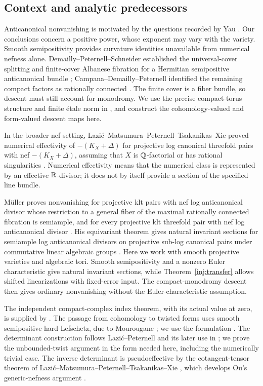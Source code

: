 \subsection{Context and analytic predecessors}
Anticanonical nonvanishing is motivated by the questions recorded by Yau \cite[Problem~75]{Yau1994}. Our conclusions concern a positive power, whose exponent may vary with the variety. Smooth semipositivity provides curvature identities unavailable from numerical nefness alone. Demailly--Peternell--Schneider established the universal-cover splitting and finite-cover Albanese fibration for a Hermitian semipositive anticanonical bundle \cite[Structure Theorem]{DPS1996}; Campana--Demailly--Peternell identified the remaining compact factors as rationally connected \cite[Theorem~1.4]{CDP2015}. The finite cover is a fiber bundle, so descent must still account for monodromy. We use the precise compact-torus structure and finite \'etale norm in \cite{CompanionH}, and construct the cohomology-valued and form-valued descent maps here.

In the broader nef setting, Lazi\'c--Matsumura--Peternell--Tsakanikas--Xie proved numerical effectivity of $-(K_X+\Delta)$ for projective log canonical threefold pairs with nef $-(K_X+\Delta)$, assuming that $X$ is $\mathbb Q$-factorial or has rational singularities \cite[Theorem~A]{LMPTX2023}. Numerical effectivity means that the numerical class is represented by an effective $\mathbb R$-divisor; it does not by itself provide a section of the specified line bundle.

M\"uller proves nonvanishing for projective klt pairs with nef log anticanonical divisor whose restriction to a general fiber of the maximal rationally connected fibration is semiample, and for every projective klt threefold pair with nef log anticanonical divisor \cite[Theorem~A and Corollary~B]{Muller2025}. His equivariant theorem gives natural invariant sections for semiample log anticanonical divisors on projective sub-log canonical pairs under commutative linear algebraic groups \cite[Theorem~C]{Muller2025}. Here we work with smooth projective varieties and algebraic tori. Smooth semipositivity and a nonzero Euler characteristic give natural invariant sections, while Theorem~\ref{inj:transfer} allows shifted linearizations with fixed-error input. The compact-monodromy descent then gives ordinary nonvanishing without the Euler-characteristic assumption.

The independent compact-complex index theorem, with its actual value at zero, is supplied by \cite[Invariant anticanonical index theorem]{CompanionI}. The passage from cohomology to twisted forms uses smooth semipositive hard Lefschetz, due to Mourougane \cite[Theorem~2.6 and Serre duality]{Mourougane1999}; we use the formulation \cite[Corollary~2.1.2]{DPS2001}. The determinant construction follows Lazi\'c--Peternell \cite[Lemma~4.1]{LP2018} and its later use in \cite[Lemma~5.1]{LMPTX2023}; we prove the unbounded-twist argument in the form needed here, including the numerically trivial case. The inverse determinant is pseudoeffective by the cotangent-tensor theorem of Lazi\'c--Matsumura--Peternell--Tsakanikas--Xie \cite[Theorem~4.1]{LMPTX2023}, which develops Ou's generic-nefness argument \cite[Theorem~1.4]{Ou2023}.

